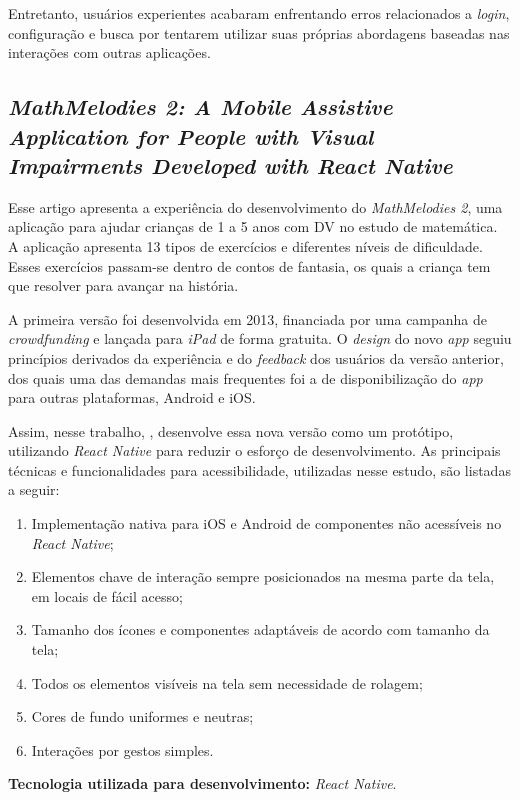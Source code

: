 Entretanto, usuários experientes acabaram enfrentando erros relacionados a \emph{login}, configuração e busca por tentarem
utilizar suas próprias abordagens baseadas nas interações com outras aplicações.

\subsection{\emph{MathMelodies 2: A Mobile Assistive Application for People with Visual Impairments Developed with React Native}}

Esse artigo apresenta a experiência do desenvolvimento do \emph{MathMelodies 2}, uma aplicação para ajudar crianças de 1 a 5 anos com DV no estudo de matemática.
A aplicação apresenta 13 tipos de exercícios e diferentes níveis de dificuldade.
Esses exercícios passam-se dentro de contos de fantasia, os quais a criança tem que resolver para avançar na história.

A primeira versão foi desenvolvida em 2013, financiada por uma campanha de \emph{crowdfunding} e lançada para \emph{iPad} de forma gratuita.
O \emph{design} do novo \emph{app} seguiu princípios derivados da experiência e do \emph{feedback} dos usuários da versão anterior, dos quais
uma das demandas mais frequentes foi a de disponibilização do \emph{app} para outras plataformas, Android e iOS\@.

Assim, nesse trabalho, , desenvolve essa nova versão como um protótipo, utilizando \emph{React Native} para reduzir o esforço de desenvolvimento.
As principais técnicas e funcionalidades para acessibilidade, utilizadas nesse estudo, são listadas a seguir:

\begin{enumerate}
    \item Implementação nativa para iOS e Android de componentes não acessíveis no \emph{React Native};
    \item Elementos chave de interação sempre posicionados na mesma parte da tela, em locais de fácil acesso;
    \item Tamanho dos ícones e componentes adaptáveis de acordo com tamanho da tela;
    \item Todos os elementos visíveis na tela sem necessidade de rolagem;
    \item Cores de fundo uniformes e neutras;
    \item Interações por gestos simples.
\end{enumerate}

\textbf{Tecnologia utilizada para desenvolvimento:} \emph{React Native}.

